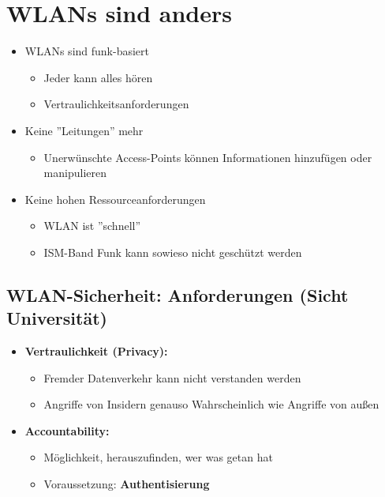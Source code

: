 \documentclass[openany]{book}
\begin{document}
\section{WLANs sind anders}

\begin{itemize}
    \item WLANs sind funk-basiert
    \begin{itemize}
        \item Jeder kann alles hören
        \item Vertraulichkeitsanforderungen
    \end{itemize}
    \item Keine ''Leitungen'' mehr
    \begin{itemize}
        \item Unerwünschte Access-Points können Informationen hinzufügen oder manipulieren 
    \end{itemize}
    \item Keine hohen Ressourceanforderungen
    \begin{itemize}
        \item WLAN ist ''schnell''
        \item ISM-Band Funk kann sowieso nicht geschützt werden
    \end{itemize}
\end{itemize}

\subsection{WLAN-Sicherheit: Anforderungen (Sicht Universität)}

\begin{itemize}
    \item \textbf{Vertraulichkeit (Privacy):}
    \begin{itemize}
        \item Fremder Datenverkehr kann nicht verstanden werden
        \item Angriffe von Insidern genauso Wahrscheinlich wie Angriffe von außen
    \end{itemize}
    \item \textbf{Accountability:}
    \begin{itemize}
        \item Möglichkeit, herauszufinden, wer was getan hat
        \item Voraussetzung: \textbf{Authentisierung}
    \end{itemize}
\end{itemize}
\end{document}
